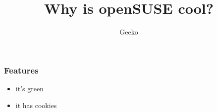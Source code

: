 \documentclass{beamer}
\author{Geeko\newline {\small openSUSE ambassador}}
\title{Why is openSUSE cool?}
\begin{document}
\begin{frame}[t,plain]
\titlepage
\end{frame}


\begin{frame}[t]
\frametitle{Features}
\begin{itemize}
\item it's green
\item it has cookies
\end{itemize}
\end{frame}
\end{document}
